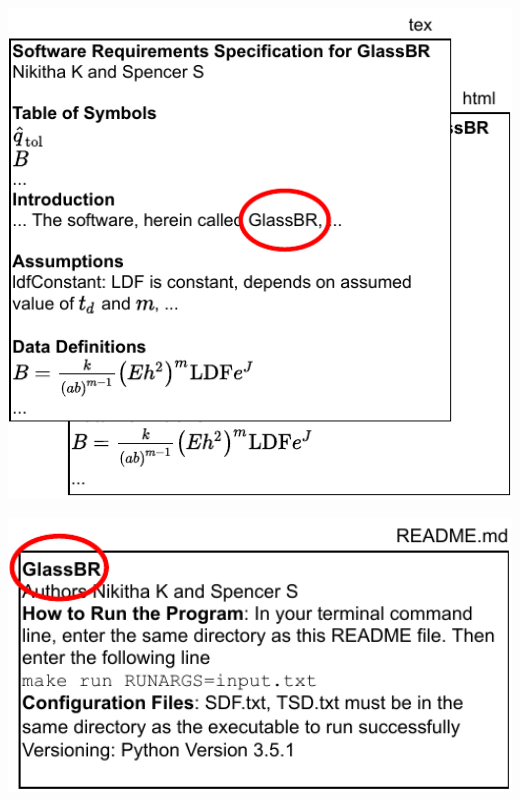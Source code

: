 \documentclass{beamer}
\begin{document}
\begin{frame}


\includegraphics[width=1.05\textwidth]{../figures/SRSCircleGlassBR.pdf}

\end{frame}


\begin{frame}


\includegraphics[width=1.05\textwidth]{../figures/READMECircleGlassBR.pdf}

\end{frame}
\end{document}
